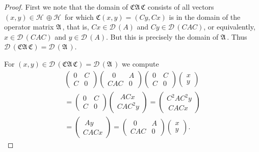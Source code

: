 \documentclass[12pt]{amsart}
\theoremstyle{definition}
\newcommand{\gA}{\mathfrak{A}\,}
\newcommand{\cD}{\mathcal{D}\,}
\newcommand{\cH}{\mathcal{H}\,}
\newcommand{\gC}{\mathfrak{C}}
\begin{document}
\begin{proof}
First we note that the domain of $\gC\gA\gC$ consists of all vectors $(x,y)\in \cH\oplus\cH$ for which  $\gC(x,y)=(Cy,Cx)$ is in the domain of the operator matrix $\gA$, that is, $Cx\in \cD(A)$ and $Cy\in \cD(CAC)$, or equivalently, $x\in \cD(CAC)$ and $y \in \cD(A)$. But this is precisely the domain of $\gA$. Thus $ \cD(\gC\gA\gC)=\cD( \gA).$

 For $(x,y)\in \cD(\gC\gA\gC)=\cD( \gA)$ we  compute \begin{gather*}
\left(
\begin{array}{ll}
 0 & C \\
C & 0
\end{array}\right) \left(
\begin{array}{ll}
 ~~~ 0 & A \\
C AC & 0
\end{array}\right)
\left(
\begin{array}{ll}
 0 & C \\
C & 0
\end{array}\right)\left(
\begin{array}{ll}
x  \\
y
\end{array}\right)\\ =\left(
\begin{array}{ll}
 0 & C\\
C & 0
\end{array}\right)\left(
\begin{array}{ll}
~~ ACx  \\
CAC^2y
\end{array}\right)=\left(
\begin{array}{ll} C^2AC^2y \\
~ CACx
\end{array}\right)\\=\left(
\begin{array}{ll}
~ Ay\\
 CACx
\end{array}\right)=\left(
\begin{array}{ll}
~~ 0 & A \\
CAC & 0
\end{array}\right)\left(
\begin{array}{ll}
 x \\
y
\end{array}\right). \end{gather*}
\end{proof}
\end{document}
